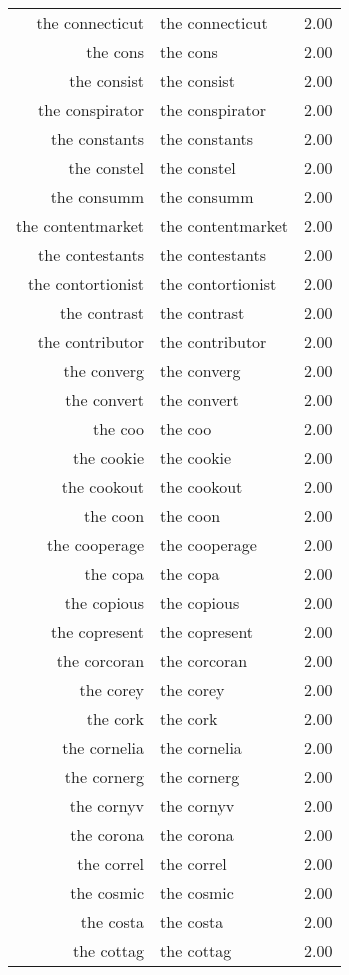 \begin{table}[ht]
\begin{tabular}{rlr}
  the connecticut & the connecticut & 2.00 \\ 
  the cons & the cons & 2.00 \\ 
  the consist & the consist & 2.00 \\ 
  the conspirator & the conspirator & 2.00 \\ 
  the constants & the constants & 2.00 \\ 
  the constel & the constel & 2.00 \\ 
  the consumm & the consumm & 2.00 \\ 
  the contentmarket & the contentmarket & 2.00 \\ 
  the contestants & the contestants & 2.00 \\ 
  the contortionist & the contortionist & 2.00 \\ 
  the contrast & the contrast & 2.00 \\ 
  the contributor & the contributor & 2.00 \\ 
  the converg & the converg & 2.00 \\ 
  the convert & the convert & 2.00 \\ 
  the coo & the coo & 2.00 \\ 
  the cookie & the cookie & 2.00 \\ 
  the cookout & the cookout & 2.00 \\ 
  the coon & the coon & 2.00 \\ 
  the cooperage & the cooperage & 2.00 \\ 
  the copa & the copa & 2.00 \\ 
  the copious & the copious & 2.00 \\ 
  the copresent & the copresent & 2.00 \\ 
  the corcoran & the corcoran & 2.00 \\ 
  the corey & the corey & 2.00 \\ 
  the cork & the cork & 2.00 \\ 
  the cornelia & the cornelia & 2.00 \\ 
  the cornerg & the cornerg & 2.00 \\ 
  the cornyv & the cornyv & 2.00 \\ 
  the corona & the corona & 2.00 \\ 
  the correl & the correl & 2.00 \\ 
  the cosmic & the cosmic & 2.00 \\ 
  the costa & the costa & 2.00 \\ 
  the cottag & the cottag & 2.00 \\ 

\end{tabular}
\end{table}
